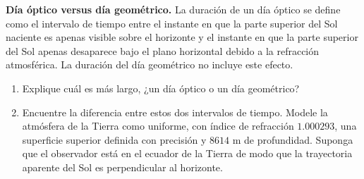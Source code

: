 \item \textbf{Día óptico versus día geométrico.}
La duración de un día óptico se define como el intervalo de tiempo entre el instante en que la parte superior del Sol naciente es apenas visible sobre el horizonte y el instante en que la parte superior del Sol apenas desaparece bajo el plano horizontal debido a la refracción atmosférica. La duración del día geométrico no incluye este efecto.
\begin{enumerate}
    \item Explique cuál es más largo, ¿un día óptico o un día geométrico?
    \item Encuentre la diferencia entre estos dos intervalos de tiempo. Modele la atmósfera de la Tierra como uniforme, con índice de refracción $1.000293$, una superficie superior definida con precisión y $8614\text{ m}$ de profundidad. Suponga que el observador está en el ecuador de la Tierra de modo que la trayectoria aparente del Sol es perpendicular al horizonte.
\end{enumerate}